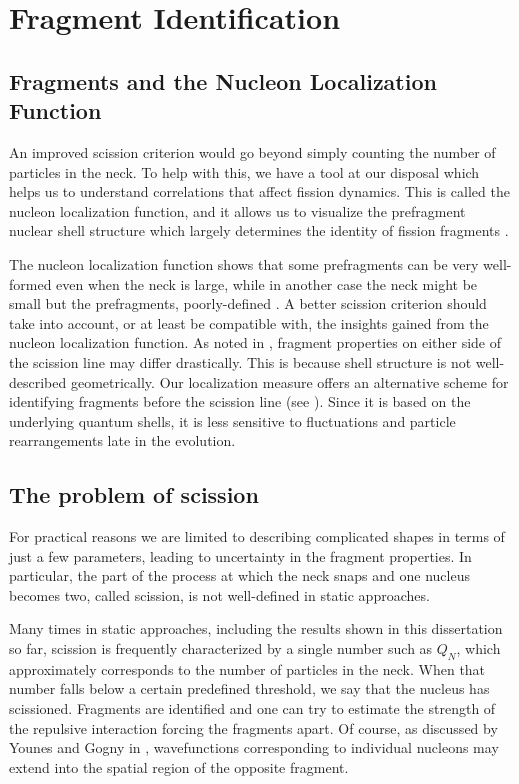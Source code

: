 \chapter{Fragment Identification}\label{append:Fragments}

\section{Fragments and the Nucleon Localization Function}
An improved scission criterion would go beyond simply counting the number of particles in the neck. To help with this, we have a tool at our disposal which helps us to understand correlations that affect fission dynamics. This is called the nucleon localization function, and it allows us to visualize the prefragment nuclear shell structure which largely determines the identity of fission fragments \cite{Zhang2016}.

The nucleon localization function shows that some prefragments can be very well-formed even when the neck is large, while in another case the neck might be small but the prefragments, poorly-defined \cite{Sadhukhan2017}. A better scission criterion should take into account, or at least be compatible with, the insights gained from the nucleon localization function. As noted in \cite{Younes2009}, fragment properties on either side of the scission line may differ drastically. This is because shell structure is not well-described geometrically. Our localization measure offers an alternative scheme for identifying fragments before the scission line (see \cite{Sadhukhan2017}). Since it is based on the underlying quantum shells, it is less sensitive to fluctuations and particle rearrangements late in the evolution.

\section{The problem of scission}
For practical reasons we are limited to describing complicated shapes in terms of just a few parameters, leading to uncertainty in the fragment properties. In particular, the part of the process at which the neck snaps and one nucleus becomes two, called scission, is not well-defined in static approaches.

Many times in static approaches, including the results shown in this dissertation so far, scission is frequently characterized by a single number such as $Q_N$, which approximately corresponds to the number of particles in the neck. When that number falls below a certain predefined threshold, we say that the nucleus has scissioned. Fragments are identified and one can try to estimate the strength of the repulsive interaction forcing the fragments apart. Of course, as discussed by Younes and Gogny in \cite{Bonneau2007,Younes2011}, wavefunctions corresponding to individual nucleons may extend into the spatial region of the opposite fragment.


